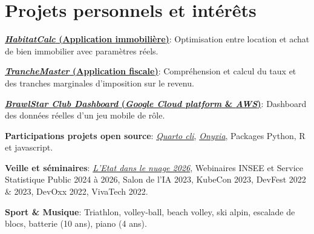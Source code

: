 \documentclass[a4paper,10.5pt]{article}
\newlength{\spaceItemEnd}\setlength{\spaceItemEnd}{-0.8pt}
\newlength{\spaceSubItem}\setlength{\spaceSubItem}{-1pt}
\newlength{\spaceProjSec}\setlength{\spaceProjSec}{0.5mm}
\newcommand{\resumeItem}[2]{
  \item\small{
    \textbf{#1}{: #2\vspace{\spaceItemEnd}}
  }
}
\newcommand{\resumeSubItem}[2]{
    \small{\resumeItem{#1}{#2}\vspace{\spaceSubItem}}
}
\newcommand{\resumeSubHeadingListStart}{\begin{itemize}[leftmargin=*, label=\textperiodcentered]} %
\newcommand{\resumeSubHeadingListEnd}{\end{itemize}}
\begin{document}
\section{Projets personnels et intérêts}
\vspace{\spaceProjSec}
\begin{minipage}[t]{0.9865\textwidth}
\resumeSubHeadingListStart
    \resumeSubItem{\href{https://odysseu.github.io/HabitatCalc/}{\textit{HabitatCalc} (Application immobilière)}}{Optimisation entre location et achat de bien immobilier avec paramètres réels.}
    \resumeSubItem{\href{https://odysseu.github.io/TrancheMaster/}{\textit{TrancheMaster} (Application fiscale)}}{Compréhension et calcul du taux et des tranches marginales d'imposition sur le revenu.}
    \resumeSubItem{\href{https://github.com/odysseu/Brawlstar-Club-Dashboard.github.io}{\textit{BrawlStar Club Dashboard} (\textit{Google Cloud platform} \& \textit{AWS})}}{Dashboard des données réelles d'un jeu mobile de rôle.}
    \resumeSubItem{Participations projets open source}{\href{https://github.com/quarto-dev/quarto-cli}{\textit{Quarto cli}}, \href{https://github.com/InseeFrLab/onyxia}{\textit{Onyxia}}, Packages Python, R et javascript.}
    \resumeSubItem{Veille et séminaires}{\href{https://www.numerique.gouv.fr/agenda/etat-dans-le-nuage-2026/}{\textit{L'Etat dans le nuage 2026}}, Webinaires INSEE et Service Statistique Public 2024 à 2026, Salon de l'IA 2023, KubeCon 2023, DevFest 2022 \& 2023, DevOxx 2022, VivaTech 2022.}
    \resumeSubItem{Sport \& Musique}{Triathlon, volley-ball, beach volley, ski alpin, escalade de blocs, batterie (10 ans), piano (4 ans).}
\resumeSubHeadingListEnd
\end{minipage}

\end{document}
